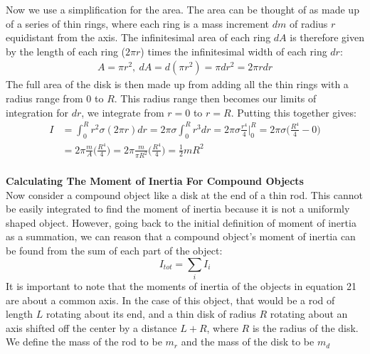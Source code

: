 \documentclass[a4paper]{article}
\let\bf\textbf
\begin{document}
Now we use a simplification for the area. The area can be thought of as made up of a series of thin rings, where each ring is a mass increment $dm$ of radius $r$ equidistant from the axis. The infinitesimal area of each ring $dA$ is therefore given by the length of each ring ($2\pi r$) times the infinitesimal width of each ring $dr$:
\begin{align*}
    A = \pi r^2,\ dA = d(\pi r^2) = \pi dr^2 = 2\pi rdr
\end{align*}
\newpage\noindent
The full area of the disk is then made up from adding all the thin rings with a radius range from 0 to $R$. This radius range then becomes our limits of integration for $dr$, we integrate from $r = 0$ to $r = R$. Putting this together gives:
\begin{align*}
    I &= \int_{0}^{R} r^2\sigma(2\pi r)dr = 2\pi\sigma\int_{0}^{R}r^3dr = 2\pi\sigma\frac{r^4}{4}\Bigg\vert_0^R = 2\pi\sigma\bigg(\frac{R^4}{4} - 0\bigg)\\
    &= 2\pi\frac{m}{A}\bigg(\frac{R^4}{4}\bigg) = 2\pi\frac{m}{\pi R^2}\bigg(\frac{R^4}{4}\bigg) = \frac{1}{2}mR^2
\end{align*}
\vspace{2mm}\\
\bf{Calculating The Moment of Inertia For Compound Objects}\vspace{2mm}\\
Now consider a compound object like a disk at the end of a thin rod. This cannot be easily integrated to find the moment of inertia because it is not a uniformly shaped object. However, going back to the initial definition of moment of inertia as a summation, we can reason that a compound object's moment of inertia can be found from the sum of each part of the object:
\begin{equation}
    I_{tot} = \sum_{i} I_i
\end{equation}
It is important to note that the moments of inertia of the objects in equation 21 are about a common axis. In the case of this object, that would be a rod of length $L$ rotating about its end, and a thin disk of radius $R$ rotating about an axis shifted off the center by a distance $L + R$, where $R$ is the radius of the disk. We define the mass of the rod to be $m_r$ and the mass of the disk to be $m_d$
\begin{center}
\end{center}
\end{document}

